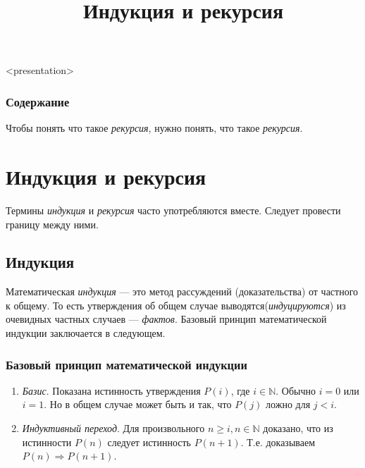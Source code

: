 


\title[Индукция и рекурсия]{Индукция и рекурсия}





\begin{frame}<presentation>
    \frametitle{Содержание}
    \tableofcontents
\end{frame}


Чтобы понять что такое \emph{рекурсия}, нужно понять, что такое \emph{рекурсия}. 


\section{Индукция и рекурсия}

Термины \emph{индукция} и \emph{рекурсия} часто употребляются вместе. Следует провести границу между ними.


\subsection{Индукция}

Математическая \emph{индукция} --- это метод рассуждений (доказательства) от частного к общему. То есть утверждения об общем случае выводятся(\emph{индуцируются}) из очевидных частных случаев --- \emph{фактов}. Базовый принцип математической индукции заключается в следующем.

\begin{frame}
    \frametitle{Базовый принцип математической индукции}
    
    \begin{enumerate}
        \item<1-> \emph{Базис}. Показана истинность утверждения $P(i)$, где $i\in\mathbb{N}$. Обычно $i=0$ или $i=1$. Но в общем случае может быть и так, что $P(j)$ ложно для $j<i$.
        \item<2-> \emph{Индуктивный переход}. Для произвольного $n\geq i,n\in\mathbb{N}$ доказано, что из истинности $P(n)$ следует истинность $P(n+1)$. Т.е. доказываем $P(n)\Rightarrow P(n+1)$.
    \end{enumerate}
\end{frame}

